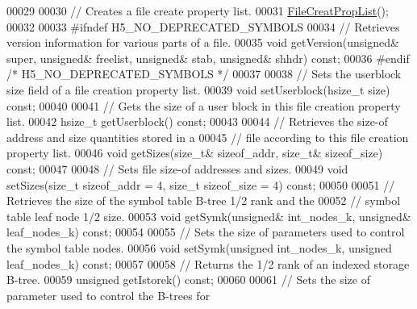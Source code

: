 \begin{DoxyCode}
00029 
00030         \textcolor{comment}{// Creates a file create property list.}
00031         \hyperlink{class_h5_1_1_file_creat_prop_list}{FileCreatPropList}();
00032 
00033 \textcolor{preprocessor}{#ifndef H5\_NO\_DEPRECATED\_SYMBOLS}
00034         \textcolor{comment}{// Retrieves version information for various parts of a file.}
00035         \textcolor{keywordtype}{void} getVersion(\textcolor{keywordtype}{unsigned}& super, \textcolor{keywordtype}{unsigned}& freelist, \textcolor{keywordtype}{unsigned}& stab, \textcolor{keywordtype}{unsigned}& shhdr) \textcolor{keyword}{const};
00036 \textcolor{preprocessor}{#endif }\textcolor{comment}{/* H5\_NO\_DEPRECATED\_SYMBOLS */}\textcolor{preprocessor}{}
00037 
00038         \textcolor{comment}{// Sets the userblock size field of a file creation property list.}
00039         \textcolor{keywordtype}{void} setUserblock(hsize\_t size) \textcolor{keyword}{const};
00040 
00041         \textcolor{comment}{// Gets the size of a user block in this file creation property list.}
00042         hsize\_t getUserblock() \textcolor{keyword}{const};
00043 
00044         \textcolor{comment}{// Retrieves the size-of address and size quantities stored in a}
00045         \textcolor{comment}{// file according to this file creation property list.}
00046         \textcolor{keywordtype}{void} getSizes(\textcolor{keywordtype}{size\_t}& sizeof\_addr, \textcolor{keywordtype}{size\_t}& sizeof\_size) \textcolor{keyword}{const};
00047 
00048         \textcolor{comment}{// Sets file size-of addresses and sizes.}
00049         \textcolor{keywordtype}{void} setSizes(\textcolor{keywordtype}{size\_t} sizeof\_addr = 4, \textcolor{keywordtype}{size\_t} sizeof\_size = 4) \textcolor{keyword}{const};
00050 
00051         \textcolor{comment}{// Retrieves the size of the symbol table B-tree 1/2 rank and the}
00052         \textcolor{comment}{// symbol table leaf node 1/2 size.}
00053         \textcolor{keywordtype}{void} getSymk(\textcolor{keywordtype}{unsigned}& int\_nodes\_k, \textcolor{keywordtype}{unsigned}& leaf\_nodes\_k) \textcolor{keyword}{const};
00054 
00055         \textcolor{comment}{// Sets the size of parameters used to control the symbol table nodes.}
00056         \textcolor{keywordtype}{void} setSymk(\textcolor{keywordtype}{unsigned} int\_nodes\_k, \textcolor{keywordtype}{unsigned} leaf\_nodes\_k) \textcolor{keyword}{const};
00057 
00058         \textcolor{comment}{// Returns the 1/2 rank of an indexed storage B-tree.}
00059         \textcolor{keywordtype}{unsigned} getIstorek() \textcolor{keyword}{const};
00060 
00061         \textcolor{comment}{// Sets the size of parameter used to control the B-trees for}

\end{DoxyCode}
